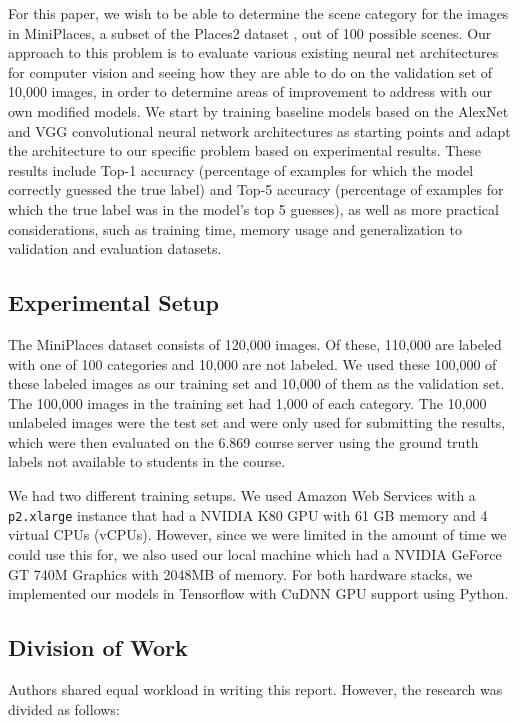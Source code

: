 \documentclass[10pt,twocolumn,letterpaper]{article}
\begin{document}
For this paper, we wish to be able to determine the scene category for the images
in MiniPlaces, a subset of the Places2 dataset \cite{Places}, out of 100
possible scenes. Our approach to this problem is to evaluate
various existing neural net architectures for computer vision and
seeing how they are able to do on the validation set of 10,000 images,
in order to determine areas of improvement to address with our own
modified models. We start by training baseline models based on
the AlexNet \cite{AlexNet} and VGG \cite{VGG} convolutional neural
network architectures as starting points and adapt the architecture
to our specific problem based on experimental results. These results
include Top-1 accuracy (percentage of examples for which the model
correctly guessed the true label) and Top-5 accuracy (percentage of
examples for which the true label was in the model's top 5 guesses),
as well as more practical considerations, such as training time,
memory usage and generalization to validation and evaluation datasets.

\subsection{Experimental Setup}
\label{exp_setup}
The MiniPlaces dataset consists of 120,000 images. Of these, 110,000 are labeled with one of 100 categories and 10,000 are not labeled.  We used these 100,000 of these labeled images as our training set and 10,000 of them as the validation set.  The 100,000 images in the training set had 1,000 of each category.  The 10,000 unlabeled images were the test set and were only used for submitting the results, which were then evaluated on the 6.869 course server using the ground truth labels not available to students in the course.

We had two different training setups. We used Amazon Web Services
with a \texttt{p2.xlarge} instance that had a NVIDIA K80 GPU with 61 GB memory and 4 virtual CPUs (vCPUs).  However, since we were limited in the amount of time we could use this for, we also used our local machine which had a NVIDIA GeForce GT 740M Graphics with 2048MB of memory. For both hardware stacks, we implemented our models in
Tensorflow with CuDNN GPU support using Python.

\subsection{Division of Work}

Authors shared equal workload in writing this report. However,
the research was divided as follows:
\end{document}
